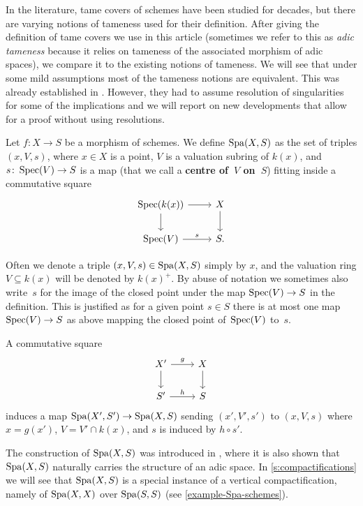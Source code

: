 In the literature, tame covers of schemes have been studied for decades, but there are varying notions of tameness used for their definition. 
After giving the definition of tame covers we use in this article (sometimes we refer to this as \emph{adic tameness} because it relies on tameness of the associated morphism of adic spaces), we compare it to the existing notions of tameness.
We will see that under some mild assumptions most of the tameness notions are equivalent.
This was already established in \cite{KerzSchmidt2010:DifferentNotionsTameness}.
However, they had to assume resolution of singularities for some of the implications and we will report on new developments that allow for a proof without using resolutions.

\begin{defi}
\label{defi:Spa for schemes}
Let $f\colon X\to S$ be a morphism of schemes. We define $\operatorname{Spa}(X,S)$ as the set of triples $(x,V,s)$, where $x \in X$ is a point, $V$ is a valuation subring of $k(x)$, and $s \colon \operatorname{Spec}(V) \to S$ is a map (that we call a \textbf{centre of~$V$ on~$S$}) fitting inside a commutative square
\[
 \begin{tikzcd}
     \Spec(k(x)) \ar[r] \ar[d] & X \ar[d] \\
     \Spec(V) \ar[r,"s"] & S.
 \end{tikzcd}
\]
\end{defi}

Often we denote a triple $(x,V,s)\in \operatorname{Spa}(X,S)$ simply by $x$, and the valuation ring $V\subseteq k(x)$ will be denoted by $k(x)^+$. By abuse of notation we sometimes also write~$s$ for the image of the closed point under the map $\operatorname{Spec}(V) \to S$ in the definition.
This is justified as for a given point $s \in S$ there is at most one map $\operatorname{Spec}(V) \to S$ as above mapping the closed point of~$\operatorname{Spec}(V)$ to~$s$.

    A commutative square 
    \[ 
        \begin{tikzcd}
            X'\ar[d] \ar[r,"g"] & X\ar[d] \\
            S'\ar[r,"h"] & S
        \end{tikzcd}
    \]
    induces a map $\operatorname{Spa}(X', S')\to \operatorname{Spa}(X, S)$ sending $(x', V',s')$ to $(x,V,s)$ where $x=g(x')$, $V = V'\cap k(x)$, and $s$ is induced by $h\circ s'$.

The construction of $\operatorname{Spa}(X,S)$ was introduced in \cite[\S~3.1]{Temkin2011:RelativeRiemannZariskiSpacesa}, where it is also shown that $\operatorname{Spa}(X,S)$ naturally carries the structure of an adic space.
In \cref{s:compactifications} we will see that $\operatorname{Spa}(X,S)$ is a special instance of a vertical compactification, namely of $\operatorname{Spa}(X,X)$ over $\operatorname{Spa}(S,S)$ (see \cref{example-Spa-schemes}).


